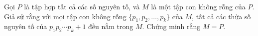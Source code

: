 \ifshowproblem
\begin{problem}\label{example:USA-2015-TSTST-P3}
    Gọi \( P \) là tập hợp tất cả các số nguyên tố, và \( M \) là một tập con không rỗng của \( P \).  
    Giả sử rằng với mọi tập con không rỗng \( \{p_1, p_2, \ldots, p_k\} \) của \( M \),  
    tất cả các thừa số nguyên tố của \( p_1p_2\cdots p_k + 1 \) đều nằm trong \( M \).  
    Chứng minh rằng \( M = P \).
\end{problem}
\fi

\footnotemark
{}
\fi